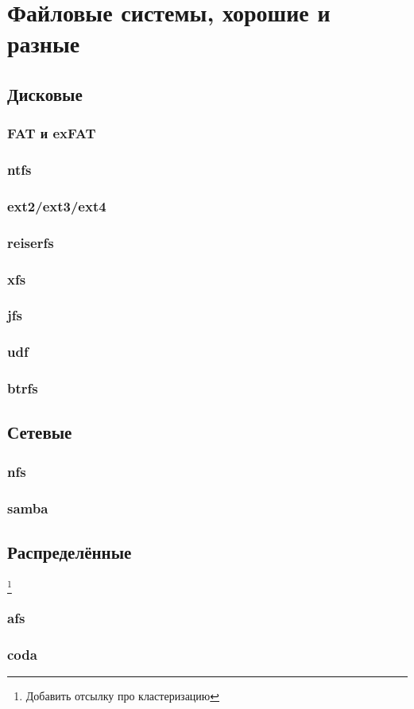 \chapter{Файловые системы, хорошие и разные}
\section{Дисковые}
\subsection{FAT и exFAT}
\subsection{ntfs}
\subsection{ext2/ext3/ext4}
\subsection{reiserfs}
\subsection{xfs}
\subsection{jfs}
\subsection{udf}
\subsection{btrfs}
\section{Сетевые}
\subsection{nfs}
\subsection{samba}
\section{Распределённые}
\footnote{Добавить отсылку про кластеризацию}
\subsection{afs}
\subsection{coda}

